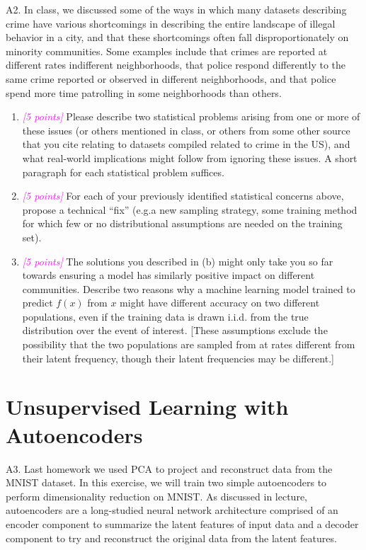 \documentclass{article}
\newcommand{\1}{\mathbf{1}}
\newcommand{\points}[1]{\small\textcolor{magenta}{\emph{[#1 points]}} \normalsize}
\begin{document}
A2. In class, we discussed some of the ways in which many datasets describing crime have various shortcomings in describing the entire landscape of illegal behavior in a city,  and that these shortcomings often fall disproportionately on minority communities. Some examples include that crimes are reported at different rates indifferent neighborhoods, that police respond differently to the same crime reported or observed in different neighborhoods, and that police spend more time patrolling in some neighborhoods than others.
\begin{enumerate}
    \item \points{5} Please describe two statistical problems arising from one or more of these issues (or others mentioned in class, or others from some other source that you cite relating to datasets compiled related to crime in the US), and what real-world implications might follow from ignoring these issues. A short paragraph for each statistical problem suffices.
    \item \points{5} For each of your previously identified statistical concerns above, propose a technical “fix” (e.g.a new sampling strategy, some training method for which few or no distributional assumptions are needed on the training set).
    \item \points{5} The solutions you described in (b) might only take you so far towards ensuring a model has similarly positive impact on different communities. Describe two reasons why a machine learning model trained to predict $f(x)$ from $x$ might have different accuracy on two different populations, even if the training data is drawn i.i.d. from the true distribution over the event of interest. [These assumptions exclude the possibility that the two populations are sampled from at rates different from their latent frequency, though their latent frequencies may be different.]
\end{enumerate}






\section*{Unsupervised Learning with Autoencoders}

A3. Last homework we used PCA to project and reconstruct data from the MNIST dataset. In this exercise, we will train two simple autoencoders to perform dimensionality reduction on MNIST. As discussed in lecture, autoencoders are a long-studied neural network architecture comprised of an encoder component to summarize the latent features of input data and a decoder component to try and reconstruct the original data from the latent features. 
\end{document}
